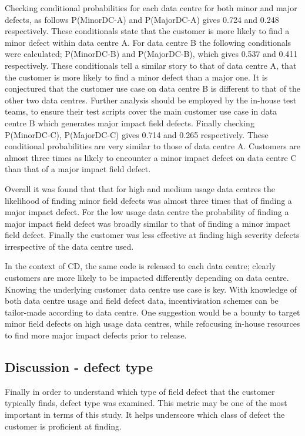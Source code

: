 Checking conditional probabilities for each data centre for both minor and major defects, as follows P(Minor\textbar DC-A) and P(Major\textbar DC-A) gives 0.724 and 0.248 respectively. These conditionals state that the customer is more likely to find a minor defect within data centre A. For data centre B  the following conditionals were calculated; P(Minor\textbar DC-B) and P(Major\textbar DC-B), which gives 0.537 and 0.411 respectively. These conditionals tell a similar story to that of data centre A, that the customer is more likely to find a minor defect than a major one. It is conjectured that the customer use case on data centre B is different to that of the other two data centres. Further analysis should be employed by the in-house test teams, to ensure their test scripts cover the main customer use case in data centre B which generates major impact field defects. Finally checking P(Minor\textbar DC-C), P(Major\textbar DC-C) gives 0.714 and 0.265 respectively. These conditional probabilities are very similar to those of data centre A. Customers are almost three times as likely to encounter a minor impact defect on data centre C than that of a major impact field defect. \par

Overall it was found that that for high and medium usage data centres the likelihood of finding minor field defects was almost three times that of finding a major impact defect. For the low usage data centre the probability of finding a major impact field defect was broadly similar to that of finding a minor impact field defect. Finally the customer was less effective at finding high severity defects irrespective of the data centre used. \par

In the context of CD, the same code is released to each data centre; clearly customers are more likely to be impacted differently depending on data centre. Knowing the underlying customer data centre use case is key.
With knowledge of both data centre usage and field defect data, incentivisation schemes can be tailor-made according to data centre. One suggestion would be a bounty to target minor field defects on high usage data centres, while refocusing in-house resources to find more major impact defects prior to release. 


\subsection{Discussion - defect type}
Finally in order to understand which type of field defect that the customer typically finds, defect type was examined. This metric may be one of the most important in terms of this study. It helps underscore which class of defect the customer is proficient at finding. \par

